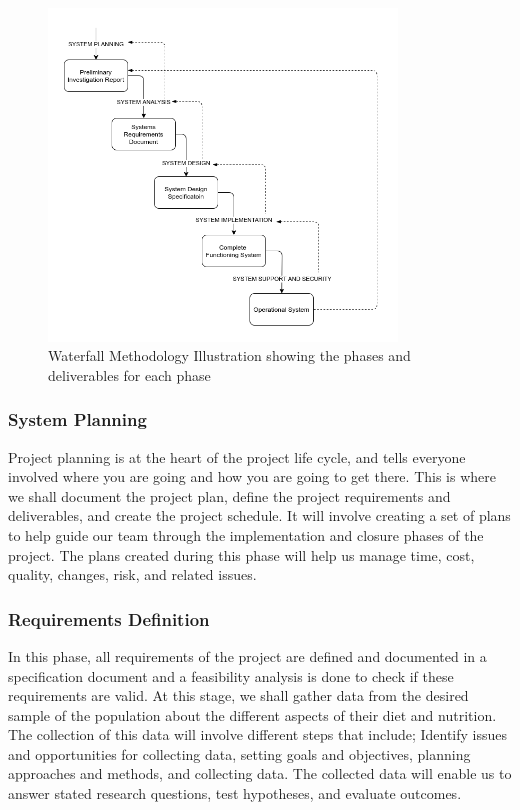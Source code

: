 \documentclass {article}
\begin{document}
\vspace{10px}
\begin{figure}[H]
    \centering
    \includegraphics[width=350px]{Images/waterfall-v3.png}
    \caption{Waterfall Methodology Illustration showing the phases and deliverables for each phase}
    \label{waterfall-SDLC-method-image}
\end{figure}
\vspace{10px}


\subsubsection{System Planning}
\noindent Project planning is at the heart of the project life cycle, and tells everyone involved where you are going and how you are going to get there. This is where we shall document the project plan, define the project requirements and deliverables, and create the project schedule. It will involve creating a set of plans to help guide our team through the implementation and closure phases of the project. The plans created during this phase will help us manage time, cost, quality, changes, risk, and related issues. 

\subsubsection{Requirements Definition}
\noindent In this phase, all requirements of the project are defined and documented in a specification document and a feasibility analysis is done to check if these requirements are valid. At this stage, we shall gather data from the desired sample of the population about the different aspects of their diet and nutrition. The collection of this data will involve different steps that include; Identify issues and opportunities for collecting data, setting goals and objectives, planning approaches and methods, and collecting data. The collected data will enable us to answer stated research questions, test hypotheses, and evaluate outcomes.\\
\end{document}
